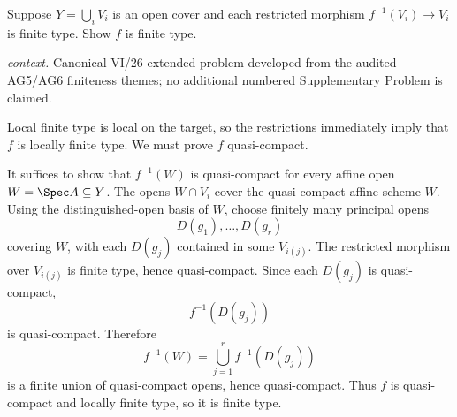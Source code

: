 \begin{problem}\label{prob:vi26-p18}
Suppose \(Y=\bigcup_iV_i\) is an open cover and each restricted morphism \(f^{-1}(V_i)\to V_i\) is finite type.  Show \(f\) is finite type.
\par\smallskip\noindent\textit{context.} Canonical VI/26 extended problem developed from the audited AG5/AG6 finiteness themes; no additional numbered Supplementary Problem is claimed.
\end{problem}

\ifdefined\FullProblemDossiers
\begin{solution}
Local finite type is local on the target, so the restrictions immediately imply that \(f\) is
locally finite type.  We must prove \(f\) quasi-compact.

It suffices to show that \(f^{-1}(W)\) is quasi-compact for every affine open
\(W=\Spec A\subseteq Y\).  The opens \(W\cap V_i\) cover the quasi-compact affine scheme \(W\).
Using the distinguished-open basis of \(W\), choose finitely many principal opens
\[
D(g_1),\ldots,D(g_r)
\]
covering \(W\), with each \(D(g_j)\) contained in some \(V_{i(j)}\).  The restricted morphism over
\(V_{i(j)}\) is finite type, hence quasi-compact.  Since each \(D(g_j)\) is quasi-compact,
\[
f^{-1}(D(g_j))
\]
is quasi-compact.  Therefore
\[
f^{-1}(W)=\bigcup_{j=1}^r f^{-1}(D(g_j))
\]
is a finite union of quasi-compact opens, hence quasi-compact.  Thus \(f\) is quasi-compact and
locally finite type, so it is finite type.
\end{solution}
\fi
